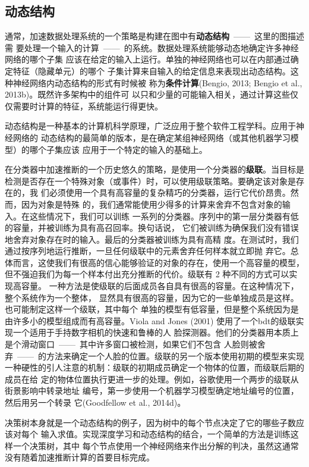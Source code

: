 \subsection{动态结构}
\label{subsec:dynamic_structure}

通常，加速数据处理系统的一个策略是构建在图中有\textbf{动态结构}~——~这里的图描述需
要处理一个输入的计算~——~的系统。数据处理系统能够动态地确定许多神经网络的哪个子集
应该在给定的输入上运行。单独的神经网络也可以在内部通过确定特征（隐藏单元）的哪个
子集计算来自输入的给定信息来表现出动态结构。这种神经网络内动态结构的形式有时候被
称为\textbf{条件计算}(Bengio, 2013; Bengio et al., 2013b)。既然许多架构中的组件可
以只和少量的可能输入相关，通过计算这些仅仅需要时计算的特征，系统能运行得更快。

动态结构是一种基本的计算机科学原理，广泛应用于整个软件工程学科。应用于神经网络的
动态结构的最简单的版本，是在确定某组神经网络（或其他机器学习模型）的哪个子集应该
应用于一个特定的输入的基础上。

在分类器中加速推断的一个历史悠久的策略，是使用一个分类器的\textbf{级联}。当目标是
检测是否存在一个特殊对象（或事件）时，可以使用级联策略。要确定该对象是存在的，我
们必须使用一个具有高容量的复杂精巧的分类器，运行它代价昂贵。然而，因为对象是特殊
的，我们通常能使用少得多的计算来舍弃不包含对象的输入。在这些情况下，我们可以训练
一系列的分类器。序列中的第一层分类器有低的容量，并被训练为具有高召回率。换句话说，
它们被训练为确保我们没有错误地舍弃对象存在时的输入。最后的分类器被训练为具有高精
度。在测试时，我们通过按序列地运行推断，一旦任何级联中的元素舍弃任何样本就立即抛
弃它。总体而言，这使我们有很高的信心能够验证的对象的存在，使用一个高容量的模型，
但不强迫我们为每一个样本付出充分推断的代价。级联有 2 种不同的方式可以实现高容量。
一种方法是使级联的后面成员各自具有很高的容量。在这种情况下，整个系统作为一个整体，
显然具有很高的容量，因为它的一些单独成员是这样。也可能制定这样一个级联，其中每个
单独的模型有低容量，但是整个系统因为是由许多小的模型组成而有高容量。Viola and
Jones (2001) 使用了一个\gls{bdt}的级联实现一个适用于手持数字相机的快速和鲁棒的人
脸探测器。他们的分类器用本质上是个滑动窗口~——~其中许多窗口被检测，如果它们不包含
人脸则被舍弃~——~的方法来确定一个人脸的位置。级联的另一个版本使用初期的模型来实现
一种硬性的引人注意的机制：级联的初期成员确定一个物体的位置，而级联后期的成员在给
定的物体位置执行更进一步的处理。例如，谷歌使用一个两步的级联从街景影响中转录地址
编号，第一步使用一个机器学习模型确定地址编号的位置，然后用另一个转录
它(Goodfellow et al., 2014d)。

决策树本身就是一个动态结构的例子，因为树中的每个节点决定了它的哪些子数应该对每个
输入求值。实现深度学习和动态结构的结合，一个简单的方法是训练这样一个决策树，其中
每个节点使用一个神经网络来作出分解的判决\citep{guo1992classification}，虽然这通常
没有随着加速推断计算的首要目标完成。

